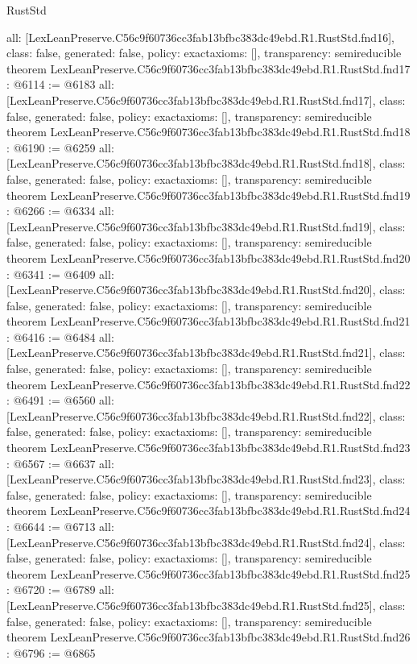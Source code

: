 \begin{lexlean}{RustStd}
\begin{coremodule}
{  all: [LexLeanPreserve.C56c9f60736cc3fab13bfbc383dc49ebd.R1.RustStd.fnd16],
  class: false,
  generated: false,
  policy: exact{axioms: []},
  transparency: semireducible
}
theorem LexLeanPreserve.C56c9f60736cc3fab13bfbc383dc49ebd.R1.RustStd.fnd17 : @6114 := @6183 {
  all: [LexLeanPreserve.C56c9f60736cc3fab13bfbc383dc49ebd.R1.RustStd.fnd17],
  class: false,
  generated: false,
  policy: exact{axioms: []},
  transparency: semireducible
}
theorem LexLeanPreserve.C56c9f60736cc3fab13bfbc383dc49ebd.R1.RustStd.fnd18 : @6190 := @6259 {
  all: [LexLeanPreserve.C56c9f60736cc3fab13bfbc383dc49ebd.R1.RustStd.fnd18],
  class: false,
  generated: false,
  policy: exact{axioms: []},
  transparency: semireducible
}
theorem LexLeanPreserve.C56c9f60736cc3fab13bfbc383dc49ebd.R1.RustStd.fnd19 : @6266 := @6334 {
  all: [LexLeanPreserve.C56c9f60736cc3fab13bfbc383dc49ebd.R1.RustStd.fnd19],
  class: false,
  generated: false,
  policy: exact{axioms: []},
  transparency: semireducible
}
theorem LexLeanPreserve.C56c9f60736cc3fab13bfbc383dc49ebd.R1.RustStd.fnd20 : @6341 := @6409 {
  all: [LexLeanPreserve.C56c9f60736cc3fab13bfbc383dc49ebd.R1.RustStd.fnd20],
  class: false,
  generated: false,
  policy: exact{axioms: []},
  transparency: semireducible
}
theorem LexLeanPreserve.C56c9f60736cc3fab13bfbc383dc49ebd.R1.RustStd.fnd21 : @6416 := @6484 {
  all: [LexLeanPreserve.C56c9f60736cc3fab13bfbc383dc49ebd.R1.RustStd.fnd21],
  class: false,
  generated: false,
  policy: exact{axioms: []},
  transparency: semireducible
}
theorem LexLeanPreserve.C56c9f60736cc3fab13bfbc383dc49ebd.R1.RustStd.fnd22 : @6491 := @6560 {
  all: [LexLeanPreserve.C56c9f60736cc3fab13bfbc383dc49ebd.R1.RustStd.fnd22],
  class: false,
  generated: false,
  policy: exact{axioms: []},
  transparency: semireducible
}
theorem LexLeanPreserve.C56c9f60736cc3fab13bfbc383dc49ebd.R1.RustStd.fnd23 : @6567 := @6637 {
  all: [LexLeanPreserve.C56c9f60736cc3fab13bfbc383dc49ebd.R1.RustStd.fnd23],
  class: false,
  generated: false,
  policy: exact{axioms: []},
  transparency: semireducible
}
theorem LexLeanPreserve.C56c9f60736cc3fab13bfbc383dc49ebd.R1.RustStd.fnd24 : @6644 := @6713 {
  all: [LexLeanPreserve.C56c9f60736cc3fab13bfbc383dc49ebd.R1.RustStd.fnd24],
  class: false,
  generated: false,
  policy: exact{axioms: []},
  transparency: semireducible
}
theorem LexLeanPreserve.C56c9f60736cc3fab13bfbc383dc49ebd.R1.RustStd.fnd25 : @6720 := @6789 {
  all: [LexLeanPreserve.C56c9f60736cc3fab13bfbc383dc49ebd.R1.RustStd.fnd25],
  class: false,
  generated: false,
  policy: exact{axioms: []},
  transparency: semireducible
}
theorem LexLeanPreserve.C56c9f60736cc3fab13bfbc383dc49ebd.R1.RustStd.fnd26 : @6796 := @6865 {
}
\end{coremodule}
\end{lexlean}
